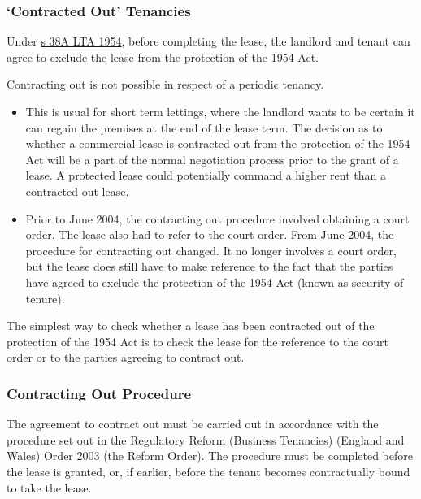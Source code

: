 \documentclass[
]{article}
\newenvironment{Shaded}{}{}
\newcommand{\NormalTok}[1]{#1}
\providecommand{\tightlist}{%
  \setlength{\itemsep}{0pt}\setlength{\parskip}{0pt}}
\begin{document}
\hypertarget{contracted-out-tenancies}{%
\subsubsection{`Contracted Out'
Tenancies}\label{contracted-out-tenancies}}

Under
\href{https://www.legislation.gov.uk/ukpga/Eliz2/2-3/56/section/38A}{s
38A LTA 1954}, before completing the lease, the landlord and tenant can
agree to exclude the lease from the protection of the 1954 Act.

\begin{Shaded}
\begin{Highlighting}[]
\NormalTok{Contracting out is not possible in respect of a periodic tenancy. }
\end{Highlighting}
\end{Shaded}

\begin{itemize}
\tightlist
\item
  This is usual for short term lettings, where the landlord wants to be
  certain it can regain the premises at the end of the lease term. The
  decision as to whether a commercial lease is contracted out from the
  protection of the 1954 Act will be a part of the normal negotiation
  process prior to the grant of a lease. A protected lease could
  potentially command a higher rent than a contracted out lease.
\item
  Prior to June 2004, the contracting out procedure involved obtaining a
  court order. The lease also had to refer to the court order. From June
  2004, the procedure for contracting out changed. It no longer involves
  a court order, but the lease does still have to make reference to the
  fact that the parties have agreed to exclude the protection of the
  1954 Act (known as security of tenure).
\end{itemize}

The simplest way to check whether a lease has been contracted out of the
protection of the 1954 Act is to check the lease for the reference to
the court order or to the parties agreeing to contract out.

\hypertarget{contracting-out-procedure}{%
\subsubsection{Contracting Out
Procedure}\label{contracting-out-procedure}}

The agreement to contract out must be carried out in accordance with the
procedure set out in the Regulatory Reform (Business Tenancies) (England
and Wales) Order 2003 (the Reform Order). The procedure must be
completed before the lease is granted, or, if earlier, before the tenant
becomes contractually bound to take the lease.
\end{document}
